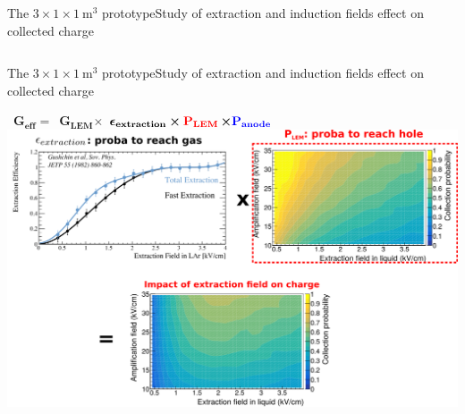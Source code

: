 \documentclass[10pt]{beamer}
\begin{document}
\begin{frame}{The \texorpdfstring{$3 \times 1 \times \SI{1}{\meter\cubed}$}{311} prototype}{Study of extraction and induction fields effect on collected charge}
\begin{scriptsize}
\begin{columns}
\begin{column}{0.65\textwidth}
	    		\end{column}
	    	\end{columns}
    	\end{scriptsize} 
    \end{frame}
    
    \begin{frame}{The \texorpdfstring{$3 \times 1 \times \SI{1}{\meter\cubed}$}{311} prototype}{Study of extraction and induction fields effect on collected charge}
    	\begin{scriptsize}
    			\hbox{
	    			\hbox{$\mathbf{G_{eff}=}$}
	    			\hbox{$\mathbf{G_{LEM}\boldsymbol{\times}}$}
	    			$\mathbf{\boldsymbol{\epsilon}_{extraction} \boldsymbol{\times} \textcolor{red}{P_{LEM}}}$\hbox{$\mathbf{\boldsymbol{\times} \textcolor{blue}{P_{anode}} }$}
	    		}
    		\centering \includegraphics[width=.95\textwidth]{figures/311/effs_extr.png}\\
    	\end{scriptsize} 
    \end{frame}
    
\end{document}
